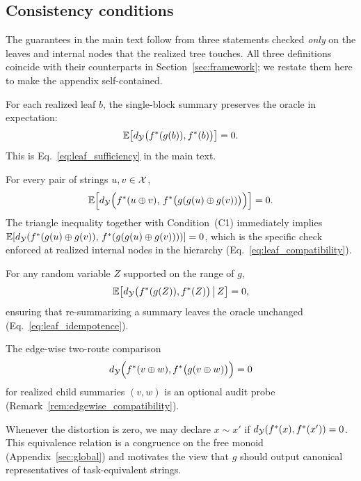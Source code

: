 \subsection{Consistency conditions}
The guarantees in the main text follow from three statements checked \emph{only} on the leaves and internal nodes that the realized tree touches. All three definitions coincide with their counterparts in Section~\ref{sec:framework}; we restate them here to make the appendix self-contained.

\begin{definition}
For each realized leaf $b$, the single-block summary preserves the oracle in expectation:
\[
\mathbb{E}\big[d_{\mathcal{Y}}\big(f^{\ast}(g(b)),f^{\ast}(b)\big)\big]=0.
\]
This is Eq.~\eqref{eq:leaf_sufficiency} in the main text.
\end{definition}

\begin{definition}
For every pair of strings $u,v\in\mathcal{X}$,
\[
\mathbb{E}\Big[d_{\mathcal{Y}}\Big(f^{\ast}(u\oplus v),\,f^{\ast}\big(g(g(u)\oplus g(v))\big)\Big)\Big]=0.
\]
The triangle inequality together with Condition~(C1) immediately implies $\mathbb{E}[d_{\mathcal{Y}}(f^{\ast}(g(u)\oplus g(v)),\,f^{\ast}(g(g(u)\oplus g(v))))]=0$, which is the specific check enforced at realized internal nodes in the hierarchy (Eq.~\eqref{eq:leaf_compatibility}).
\end{definition}

\begin{definition}
For any random variable $Z$ supported on the range of $g$,
\[
\mathbb{E}\big[d_{\mathcal{Y}}\big(f^{\ast}(g(Z)),f^{\ast}(Z)\big)\,\big|\,Z\big]=0,
\]
ensuring that re-summarizing a summary leaves the oracle unchanged (Eq.~\eqref{eq:leaf_idempotence}).
\end{definition}

The edge-wise two-route comparison
\[
d_{\mathcal{Y}}\Big(f^{\ast}(v\oplus w),f^{\ast}\big(g(v\oplus w)\big)\Big)=0
\]
for realized child summaries $(v,w)$ is an optional audit probe (Remark~\ref{rem:edgewise_compatibility}).

\begin{remark}
Whenever the distortion is zero, we may declare $x\sim x'$ if $d_{\mathcal{Y}}(f^{\ast}(x),f^{\ast}(x'))=0$. This equivalence relation is a congruence on the free monoid (Appendix~\ref{sec:global}) and motivates the view that $g$ should output canonical representatives of task-equivalent strings.
\end{remark}

